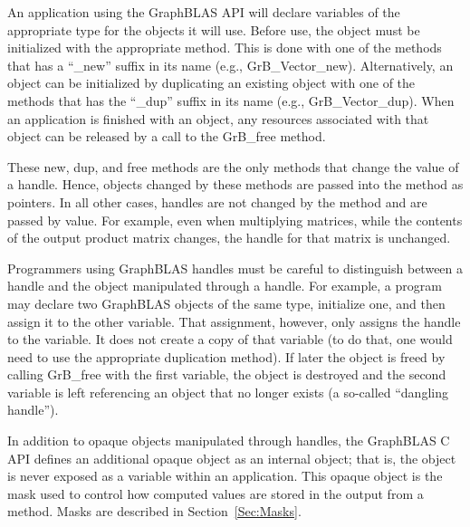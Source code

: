 An application using the GraphBLAS API will declare variables of the appropriate
type for the objects it will use.  Before use, the object must be initialized with 
the appropriate method.  This is done with one of the methods that has a ``{\sf \_new}'' suffix in its 
name (e.g., {\sf GrB\_Vector\_new}).  Alternatively, an object can be initialized by duplicating
an existing object with one of the methods that has the ``{\sf \_dup}'' suffix in its 
name  (e.g., {\sf GrB\_Vector\_dup}).   When an application is finished with 
an object, any resources associated with that object can be released by a
call to the {\sf GrB\_free} method.    

These {\sf new}, {\sf dup}, and {\sf free} methods are the only methods that 
change the value of a handle.  Hence, objects changed by these methods are passed
into the method as pointers.  In all other cases, handles are not changed by the 
method and are passed by value.  For example, even when multiplying matrices, 
while the contents of the output product matrix changes, the handle for that matrix is unchanged. 

Programmers using GraphBLAS handles must be careful to distinguish between a handle and the 
object manipulated through a handle.  For example, a program may declare two 
GraphBLAS objects of the same type, initialize one, and then assign it to the other
variable.  That assignment, however, only assigns the handle to the variable.  It does not 
create a copy of that variable (to do that, one would need to use the appropriate duplication method).
If later the object is freed by calling {\sf GrB\_free} with the first variable, the object
is destroyed and the second variable is left referencing an object that no longer 
exists (a so-called ``dangling handle'').

In addition to opaque objects manipulated through handles, the GraphBLAS C API defines
an additional opaque object as an internal object; that is, the object is never exposed as
a variable within an application.  This opaque object is the mask used to
control how computed values are stored in the output from a method.  Masks 
are described in Section~\ref{Sec:Masks}.

